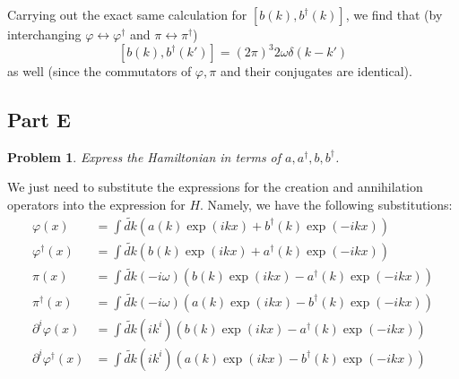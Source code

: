 \documentclass[fontsize=11pt]{scrartcl} %
\numberwithin{equation}{section} %
\numberwithin{figure}{section} %
\numberwithin{table}{section} %
\newtheorem*{problem}{Problem}
\begin{document}
Carrying out the exact same calculation for $\left[ b(k),b^{\dagger}(k) \right]$,
we find that (by interchanging $\varphi \leftrightarrow \varphi^{\dagger}$ and
$\pi\leftrightarrow\pi^{\dagger}$)
\[
    \left[ b(k),b^{\dagger}(k') \right] = (2\pi)^{3}2\omega\delta(k-k')
\]
as well (since the commutators of $\varphi,\pi$ and their conjugates are
identical).

\newpage
\subsection*{Part E}
\begin{problem}
    Express the Hamiltonian in terms of $a,a^{\dagger},b,b^{\dagger}$.
\end{problem}

We just need to substitute the expressions for the creation and annihilation
operators into the expression for $H$. Namely, we have the following
substitutions:
\[
    \begin{aligned}
        \varphi(x) &= \int \tilde{dk}\left( a(k)\exp(ikx) +
            b^{\dagger}(k)\exp(-ikx) \right)\\
        \varphi^{\dagger}(x) &= \int\tilde{dk}\left( b(k)\exp(ikx) +
            a^{\dagger}(k)\exp(-ikx) \right)\\
        \pi(x) &= \int \tilde{dk}(-i\omega)\left( b(k)\exp(ikx) -
            a^{\dagger}(k)\exp(-ikx) \right)\\
        \pi^{\dagger}(x) &= \int \tilde{dk}(-i\omega)\left( a(k)\exp(ikx) -
            b^{\dagger}(k)\exp(-ikx) \right)\\
        \partial^i\varphi(x) &= \int \tilde{dk}(ik^i)\left( b(k)\exp(ikx) -
            a^{\dagger}(k)\exp(-ikx)\right)\\
            \partial^i\varphi^{\dagger}(x) &= \int \tilde{dk}(ik^i)\left( a(k)\exp(ikx) -
            b^{\dagger}(k)\exp(-ikx)\right)\\
    \end{aligned}
\]
\end{document}
